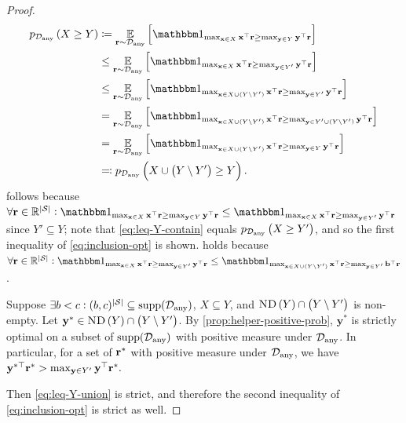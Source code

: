 \begin{proof}
\begin{align}
    \phelper{X\geq Y}[\Dany]&\defeq \E{\rf \sim \Dany}{\indic{\max_{\x\in X} \x^\top \rf \geq \max_{\mathbf{y} \in Y} \mathbf{y}^\top \rf}}\\
    &\leq \E{\rf \sim \Dany}{\indic{\max_{\x\in X} \x^\top \rf \geq \max_{\mathbf{y} \in Y'} \mathbf{y}^\top \rf}}\label{eq:leq-Y-contain}\\
    &\leq \E{\rf \sim \Dany}{\indic{\max_{\x\in X\cup (Y\setminus Y')} \x^\top \rf \geq \max_{\mathbf{y} \in Y'} \mathbf{y}^\top \rf}}\label{eq:leq-Y-union}\\
    &= \E{\rf \sim \Dany}{\indic{\max_{\x\in X\cup (Y\setminus Y')} \x^\top \rf \geq \max_{\mathbf{y} \in Y'\cup (Y\setminus Y')} \mathbf{y}^\top \rf}}\label{eq:leq-Y-union-2}\\
    &=\E{\rf \sim \Dany}{\indic{\max_{\x\in X\cup (Y\setminus Y')} \x^\top \rf \geq \max_{\mathbf{y} \in Y} \mathbf{y}^\top \rf}}\\
    &\eqdef \phelper{X\cup\prn{Y\setminus Y'}\geq Y}[\Dany].
\end{align}
 follows because $\forall \rf \in \rewardVS: \indic{\max_{\x\in X} \x^\top \rf \geq \max_{\mathbf{y} \in Y} \mathbf{y}^\top \rf}\leq \indic{\max_{\x\in X} \x^\top \rf \geq \max_{\mathbf{y} \in Y'} \mathbf{y}^\top \rf}$ since $Y' \subseteq Y$; note that \cref{eq:leq-Y-contain} equals $\phelper{X\geq Y'}[\Dany]$, and so the first inequality of \cref{eq:inclusion-opt} is shown.  holds because $\forall \rf \in \rewardVS: \indic{\max_{\x\in X} \x^\top \rf \geq \max_{\mathbf{y} \in Y'} \mathbf{y}^\top \rf}\leq \indic{\max_{\x\in X\cup (Y\setminus Y')} \x^\top \rf \geq \max_{\mathbf{y} \in Y'} \bv^\top \rf}$. 

Suppose $\exists b<c: (b,c)^{\abs{\St}}\subseteq \supp[\Dany]$, $X\subseteq Y$, and $\text{\upshape\textsc{ND}}\left(Y\right)\cap \left(Y\setminus Y'\right)$ is non-empty. Let $\mathbf{y}^*\in \text{\upshape\textsc{ND}}\left(Y\right)\cap \left(Y\setminus Y'\right)$. By \cref{prop:helper-positive-prob}, $\mathbf{y}^*$ is strictly optimal on a subset of $\supp[\Dany]$ with positive measure under $\mathcal{D}_{\text{any}}$. In particular, for a set of $\mathbf{r}^*$ with positive measure under $\mathcal{D}_{\text{any}}$, we have $\mathbf{y}^{*\top}\mathbf{r}^*> \max_{\mathbf{y}\in Y'} \mathbf{y}^\top \mathbf{r}^*.$

Then \cref{eq:leq-Y-union} is strict, and therefore the second inequality of \cref{eq:inclusion-opt} is strict as well.
\end{proof}

